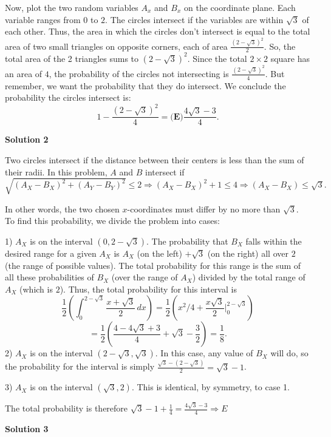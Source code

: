 \begin{enumerate}
 Now, plot the two random variables $A_x$ and $B_x$ on the coordinate plane. Each variable ranges from $0$ to $2$. The circles intersect if the variables are within $\sqrt{3}$ of each other. Thus, the area in which the circles don't intersect is equal to the total area of two small triangles on opposite corners, each of area $\frac{(2-\sqrt{3})^2}{2}$. So, the total area of the 2 triangles sums to $(2-\sqrt{3})^2$. Since the total $2 \times 2$ square has an area of $4$, the probability of the circles not intersecting is $\frac{(2-\sqrt{3})^2}{4}$. But remember, we want the probability that they do intersect. We conclude the probability the circles intersect is:
 \[1-\frac{(2-\sqrt{3})^2}{4}=\boxed{\textbf{(E)}\frac{4\sqrt{3}-3}{4}}.\]




\textbf{Solution 2}

Two circles intersect if the distance between their centers is less than the sum of their radii. In this problem, $A$ and $B$ intersect if $\sqrt{(A_X-B_X)^2+(A_Y-B_Y)^2}\leq2 \Rightarrow (A_X-B_X)^2+1\leq4 \Rightarrow (A_X-B_X)\leq \sqrt{3}.$

 In other words, the two chosen $x$-coordinates must differ by no more than $\sqrt{3}$. To find this probability, we divide the problem into cases:

 1) $A_X$ is on the interval $(0,2-\sqrt{3})$. The probability that $B_X$ falls within the desired range for a given $A_X$ is $A_X$ (on the left) $+\sqrt{3}$ (on the right) all over $2$ (the range of possible values). The total probability for this range is the sum of all these probabilities of $B_X$ (over the range of $A_X$) divided by the total range of $A_X$ (which is $2$). Thus, the total probability for this interval is 
 \[\frac{1}{2}\left(\int_{0}^{2-\sqrt{3}} \frac{x+\sqrt{3}}{2}\,dx\right) =\frac{1}{2}\left(x^2/4+\frac{x\sqrt{3}}{2} \Big |_{0}^{2-\sqrt{3}}\right)\] 
 \[= \frac{1}{2}(\frac{4-4\sqrt{3}+3}{4} + \sqrt{3}-\frac{3}{2}) =\frac{1}{8}.\]2) $A_X$ is on the interval $(2-\sqrt{3},\sqrt{3})$. In this case, any value of $B_X$ will do, so the probability for the interval is simply $\frac{\sqrt{3}-(2-\sqrt{3})}{2} = \sqrt{3}-1$.

 3) $A_X$ is on the interval $(\sqrt{3},2)$. This is identical, by symmetry, to case 1.

 The total probability is therefore $\sqrt{3}-1+\frac{1}{4} = \frac{4\sqrt{3}-3}{4} \Rightarrow \boxed{E}$




\textbf{Solution 3}


\end{enumerate}
